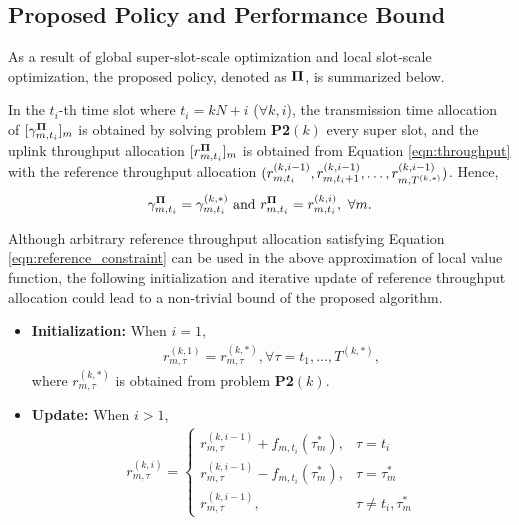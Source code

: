 \subsection{Proposed Policy and Performance Bound}
As a result of global super-slot-scale optimization and local slot-scale optimization, the proposed policy, denoted as $\mathbf{\Pi}$, is summarized below.
\begin{definition}
    \label{def:baseline}
    In the $t_i$-th time slot where $t_i=kN+i$ ($\forall k,i$),
    the transmission time allocation of {\IAVs} $[ \gamma^{\mathbf{\Pi}}_{m,t_i}]_m$ is obtained by solving problem \textbf{P2$(k)$} every super slot, and the uplink throughput allocation $[ r^{\mathbf{\Pi}}_{m,t_i}]_m$ is obtained from Equation \eqref{eqn:throughput} with the reference throughput allocation
    $( r^{(k,i-1)}_{m,t_i}, r^{(k,i-1)}_{m,t_i+1}, \dots, r^{(k,i-1)}_{m,T^{(k,*)}} )$.
    Hence,  $$\gamma^{\mathbf{\Pi}}_{m,t_i}=\gamma^{(k,*)}_{m,t_i} \mbox{ and } r^{\mathbf{\Pi}}_{m,t_i} = r^{(k,i)}_{m,t_i}, \ \forall m.$$
\end{definition}

Although arbitrary reference throughput allocation satisfying Equation \eqref{eqn:reference_constraint} can be used in the above approximation of local value function, the following initialization and iterative update of reference throughput allocation could lead to a non-trivial bound of the proposed algorithm. 
\begin{itemize}
    \item {\bf Initialization:} When $i=1$, 
    \begin{align}
        r^{(k,1)}_{m,\tau} = r^{(k,*)}_{m,\tau}, \forall \tau = t_{1}, \dots, T^{(k,*)}\nonumber,
    \end{align}
    where $r^{(k,*)}_{m,\tau}$ is obtained from problem {\bf P2}$(k)$.
    \item {\bf Update:} When $i>1$,
    \begin{align}
    r^{(k,i)}_{m,\tau} = 
    \begin{cases}
        r^{(k,i-1)}_{m,\tau} + f_{m,t_{i}}(\tau_m^*), &\tau=t_i
        \\
        r^{(k,i-1)}_{m,\tau} - f_{m,t_{i}}(\tau_m^*), &\tau=\tau^*_{m}
        \\
        r^{(k,i-1)}_{m,\tau}, &\tau \neq t_i, \tau^*_{m}
    \end{cases}
    \label{eqn:approx_solution}
\end{align}
\end{itemize}


